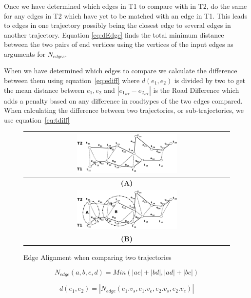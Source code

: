 Once we have determined which edges in T1 to compare with in T2, do the same for any edges in T2 which have yet to be matched with an edge in T1. This leads to edges in one trajectory possibly being the closest edge to several edges in another trajectory. Equation \ref{eq:dEdge} finds the total minimum distance between the two pairs of end vertices using the vertices of the input edges as arguments for \(N_{edges}\).

When we have determined which edges to compare we calculate the difference between them using equation~\ref{eq:ediff} where \(d(e_{1}, e_{2}) \) is divided by two to get the mean distance between $e_1,e_2$ and  \(|e_{1_{RT}} - e_{2_{RT}}|\) is the Road Difference which adds a penalty based on any difference in roadtypes of the two edges compared.
When calculating the difference between two trajectories, or sub-trajectories, we use equation~\ref{eq:tdiff} 


\begin{figure}	
  \center
  \begin{tabular}{c}
	\includegraphics[width=0.5\textwidth]{figures/edgeAlignment2} \\\hline
	{\bf(A)} \\
	\includegraphics[width=0.5\textwidth]{figures/edgeAlignment3} \\\hline
	{\bf(B)}
  \end{tabular}
  \caption{Edge Alignment when comparing two trajectories}
  \label{fig:edgeAlign}
\end{figure}

\begin{equation}\label{eq:cEdge}
N_{edge}(a,b,c,d) = Min\left(| ac | + | bd |, | ad | +| bc | \right)
\end{equation} 

\begin{equation}\label{eq:dEdge}
d(e_{1}, e_{2}) = | N_{edge}(e_1.v_s, e_1.v_e, e_2.v_s, e_2.v_e) |
\end{equation} 

